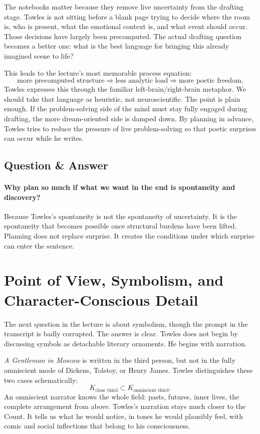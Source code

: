 The notebooks matter because they remove live uncertainty from the drafting stage. Towles is not sitting before a blank page trying to decide where the room is, who is present, what the emotional context is, and what event should occur. Those decisions have largely been precomputed. The actual drafting question becomes a better one: what is the best language for bringing this already imagined scene to life?

This leads to the lecture's most memorable process equation:
\begin{equation}
\text{more precomputed structure} \Rightarrow \text{less analytic load} \Rightarrow \text{more poetic freedom}.
\end{equation}
Towles expresses this through the familiar left-brain/right-brain metaphor. We should take that language as heuristic, not neuroscientific. The point is plain enough. If the problem-solving side of the mind must stay fully engaged during drafting, the more dream-oriented side is damped down. By planning in advance, Towles tries to reduce the pressure of live problem-solving so that poetic surprises can occur while he writes.

\subsection{Question \& Answer}

\paragraph{Why plan so much if what we want in the end is spontaneity and discovery?}

Because Towles's spontaneity is not the spontaneity of uncertainty. It is the spontaneity that becomes possible once structural burdens have been lifted. Planning does not replace surprise. It creates the conditions under which surprise can enter the sentence.

\section{Point of View, Symbolism, and Character-Conscious Detail}

The next question in the lecture is about symbolism, though the prompt in the transcript is badly corrupted. The answer is clear. Towles does not begin by discussing symbols as detachable literary ornaments. He begins with narration.

\emph{A Gentleman in Moscow} is written in the third person, but not in the fully omniscient mode of Dickens, Tolstoy, or Henry James. Towles distinguishes these two cases schematically:
\begin{equation}
K_{\text{close third}} \subset K_{\text{omniscient third}}.
\end{equation}
An omniscient narrator knows the whole field: pasts, futures, inner lives, the complete arrangement from above. Towles's narration stays much closer to the Count. It tells us what he would notice, in tones he would plausibly feel, with comic and social inflections that belong to his consciousness.


